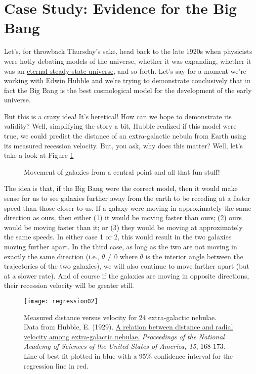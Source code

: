 \section{Case Study: Evidence for the Big Bang}

Let's, for throwback Thursday's sake, head back to the late 1920s when physicists were hotly debating models of the universe, whether it was expanding, whether it was an \href{http://en.wikipedia.org/wiki/Steady_state_theory}{eternal steady state universe}, and so forth. Let's say for a moment we're working with Edwin Hubble and we're trying to demonstrate conclusively that in fact the Big Bang is the best cosmological model for the development of the early universe.

But this is a crazy idea! It's heretical! How can we hope to demonstrate its validity? Well, simplifying the story a bit, Hubble realized if this model were true, we could predict the distance of an extra-galactic nebula from Earth using its measured recession velocity. But, you ask, why does this matter? Well, let's take a look at Figure \ref{fig:regression06}

\begin{figure}[h]

\label{fig:regression06}
\caption{Movement of galaxies from a central point and all that fun stuff!}
\end{figure}

The idea is that, if the Big Bang were the correct model, then it would make sense for us to see galaxies further away from the earth to be receding at a faster speed than those closer to us. If a galaxy were moving in approximately the same direction as ours, then either (1) it would be moving faster than ours; (2) ours would be moving faster than it; or (3) they would be moving at approximately the same speeds. In either case 1 or 2, this would result in the two galaxies moving further apart. In the third case, as long as the two are not moving in exactly the same direction (i.e., $\theta \neq 0$ where $\theta$ is the interior angle between the trajectories of the two galaxies), we will also continue to move farther apart (but at a slower rate). And of course if the galaxies are moving in opposite directions, their recession velocity will be greater still.

\begin{figure}[h]
\texttt{[image: regression02]}
\label{fig:regression02}
\caption{Measured distance versus velocity for 24 extra-galactic nebulae. Data from Hubble, E. (1929). \href{http://www.ncbi.nlm.nih.gov/pmc/articles/PMC522427/}{A relation between distance and radial velocity among extra-galactic nebulae.} \textit{Proceedings of the National Academy of Sciences of the United States of America, 15}, 168-173. Line of best fit plotted in blue with a 95\% confidence interval for the regression line in red.}
\end{figure}

